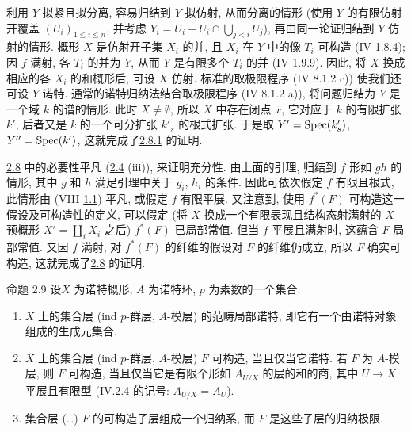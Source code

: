 利用 $Y$ 拟紧且拟分离, 容易归结到 $Y$ 拟仿射, 从而分离的情形
(使用 $Y$ 的有限仿射开覆盖 $(U_i)_{1\leq i\leq n}$,
并考虑 $Y_i=U_i-U_i\cap \bigcup_{j< i} U_j$),
再由同一论证归结到 $Y$ 仿射的情形.
概形 $X$ 是仿射开子集 $X_i$ 的并, 且 $X_i$ 在 $Y$ 中的像 $T_i$ 可构造
(\EGA IV 1.8.4); 因 $f$ 满射, 各 $T_i$ 的并为 $Y$,
从而 $Y$ 是有限多个 $T_i$ 的并 (\EGA IV 1.9.9).
因此, 将 $X$ 换成相应的各 $X_i$ 的和概形后, 可设 $X$ 仿射.
标准的取极限程序 (\EGA IV 8.1.2 c)) 使我们还可设 $Y$ 诺特.
通常的诺特归纳法结合取极限程序 (\EGA IV 8.1.2 a)),
将问题归结为 $Y$ 是一个域 $k$ 的谱的情形.
此时 $X\neq ∅$, 所以 $X$ 中存在闭点 $x$,
它对应于 $k$ 的有限扩张 $k'$, 后者又是 $k$ 的一个可分扩张 $k'_s$ 的根式扩张.
于是取 $Y'=\operatorname{Spec}(k'_s)$, $Y''=\operatorname{Spec}(k')$,
这就完成了\hyperref[IX.lem2.8.1]{2.8.1} 的证明.

\hyperref[IX.prop2.8]{2.8} 中的必要性平凡 (\hyperref[IX.prop2.4]{2.4} (iii)),
来证明充分性.
由上面的引理, 归结到 $f$ 形如 $gh$ 的情形,
其中 $g$ 和 $h$ 满足引理中关于 $g_i$, $h_i$ 的条件.
因此可依次假定 $f$ 有限且根式, 此情形由 (VIII \hyperref[VIII.thm1.1]{1.1}) 平凡,
或假定 $f$ 有限平展.
又注意到, 使用 $f^{\ast}(F)$ 可构造这一假设及可构造性的定义,
可以假定 (将 $X$ 换成一个有限表现且结构态射满射的 $X$-预概形
$X'=\coprod_i X_i$ 之后) $f^{\ast}(F)$ 已局部常值.
但当 $f$ 平展且满射时, 这蕴含 $F$ 局部常值.
又因 $f$ 满射, 对 $f^{\ast}(F)$ 的纤维的假设对 $F$ 的纤维仍成立,
所以 $F$ 确实可构造,
这就完成了\hyperref[IX.prop2.8]{2.8} 的证明.

\begin{enonce*}{命题 2.9}
设\pageoriginale $X$ 为诺特概形, $A$ 为诺特环,
$p$ 为素数的一个集合.
\begin{enumerate}
\renewcommand{\theenumi}{\roman{enumi}}
\renewcommand{\labelenumi}{(\theenumi)}
\item $X$ 上的集合层 (\resp ind $p$-群层, \resp $A$-模层) 的范畴局部诺特,
即它有一个由诺特对象组成的生成元集合.

\item $X$ 上的集合层 (\resp ind $p$-群层, \resp $A$-模层) $F$ 可构造,
当且仅当它诺特.
若 $F$ 为 $A$-模层, 则 $F$ 可构造,
当且仅当它是有限个形如 $A_{U/X}$ 的层的和的商,
其中 $U\rightarrow X$ 平展且有限型
({\rm \hyperref[IV.subsec2.4]{IV.2.4}} 的记号: $A_{U/X}=A_U$).


\item 集合层 (\resp\ldots) $F$ 的可构造子层组成一个归纳系,
而 $F$ 是这些子层的归纳极限.
\end{enumerate}
\end{enonce*}

